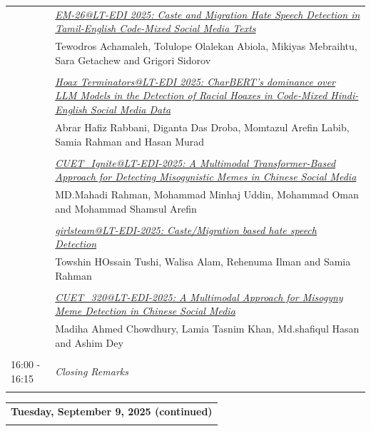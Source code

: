 \documentclass[11pt,oneside]{book}
\begin{document}
\begin{tabular}{p{24mm}p{124mm}}
                      & \hyperlink{page.152}{\emph{EM-26@LT-EDI 2025: Caste and Migration Hate Speech Detection in Tamil-English Code-Mixed Social Media Texts}}\\
        & Tewodros Achamaleh\index{Achamaleh}, Tolulope Olalekan Abiola\index{Abiola}, Mikiyas Mebraihtu\index{Mebraihtu}, Sara Getachew\index{Getachew} and Grigori Sidorov\index{Sidorov}\\\\
                
                      & \hyperlink{page.159}{\emph{Hoax Terminators@LT-EDI 2025: CharBERT's dominance over LLM Models in the Detection of Racial Hoaxes in Code-Mixed Hindi-English Social Media Data}}\\
        & Abrar Hafiz Rabbani\index{Rabbani}, Diganta Das Droba\index{Droba}, Momtazul Arefin Labib\index{Labib}, Samia Rahman\index{Rahman} and Hasan Murad\index{Murad}\\\\
                
                      & \hyperlink{page.171}{\emph{CUET\_Ignite@LT-EDI-2025: A Multimodal Transformer-Based Approach for Detecting Misogynistic Memes in Chinese Social Media}}\\
        & MD.Mahadi Rahman\index{Rahman}, Mohammad Minhaj Uddin\index{Uddin}, Mohammad Oman\index{Oman} and Mohammad Shamsul Arefin\index{Arefin}\\\\
                
                      & \hyperlink{page.177}{\emph{girlsteam@LT-EDI-2025: Caste/Migration based hate speech Detection}}\\
        & Towshin HOssain Tushi\index{Tushi}, Walisa Alam\index{Alam}, Rehenuma Ilman\index{Ilman} and Samia Rahman\index{Rahman}\\\\
                
                      & \hyperlink{page.183}{\emph{CUET\_320@LT-EDI-2025: A Multimodal Approach for Misogyny Meme Detection in Chinese Social Media}}\\
        & Madiha Ahmed Chowdhury\index{Chowdhury}, Lamia Tasnim Khan\index{Khan}, Md.shafiqul Hasan\index{Hasan} and Ashim Dey\index{Dey}\\\\
                        16:00 - 16:15 & \emph{Closing Remarks}\\\\
      
              \end{tabular}

      
    \begin{tabular}{p{24mm}p{124mm}}
    \multicolumn{2}{l}{\bf Tuesday, September 9, 2025 (continued)} \\\\
        \end{tabular}

  
\end{document}
